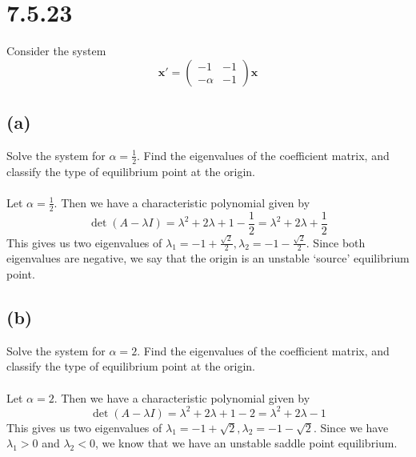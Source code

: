 \documentclass{article}
\theoremstyle{definition}
\begin{document}
\section*{7.5.23}
    \begin{mdframed}[]
        Consider the system
        \[
            \bm x' =
            \begin{pmatrix}
                -1 & -1 \\
                -\alpha & -1
            \end{pmatrix}
            \bm x
        \]
    \end{mdframed}
    \subsection*{(a)}
        Solve the system for $\alpha = \frac{1}{2}$. Find the eigenvalues of the coefficient matrix, and classify the 
        type of equilibrium point at the origin.\\\\
        Let $\alpha = \frac{1}{2}$. Then we have a characteristic polynomial given by 
        \[
            \det (A - \lambda I) = \lambda^2 + 2 \lambda + 1 - \frac{1}{2} = \lambda^2 + 2 \lambda + \frac{1}{2}
        \]
        This gives us two eigenvalues of $\lambda_1 = -1 + \frac{\sqrt{2}}{2}, \lambda_2 = -1 - \frac{\sqrt{2}}{2}$. Since both eigenvalues 
        are negative, we say that the origin is an unstable `source' equilibrium point.
    \subsection*{(b)}
        Solve the system for $\alpha = 2$. Find the eigenvalues of the coefficient matrix, and classify the type of equilibrium point at the origin.\\\\
        Let $\alpha = 2$. Then we have a characteristic polynomial given by
        \[
            \det (A - \lambda I) = \lambda^2 + 2 \lambda + 1 - 2 = \lambda^2 + 2 \lambda - 1
        \]
        This gives us two eigenvalues of $\lambda_1 = -1 + \sqrt{2}, \lambda_2 = -1 - \sqrt{2}$.
        Since we have $\lambda_1 > 0$ and $\lambda_2 < 0$, we know that we have an unstable saddle point equilibrium.
\end{document}
